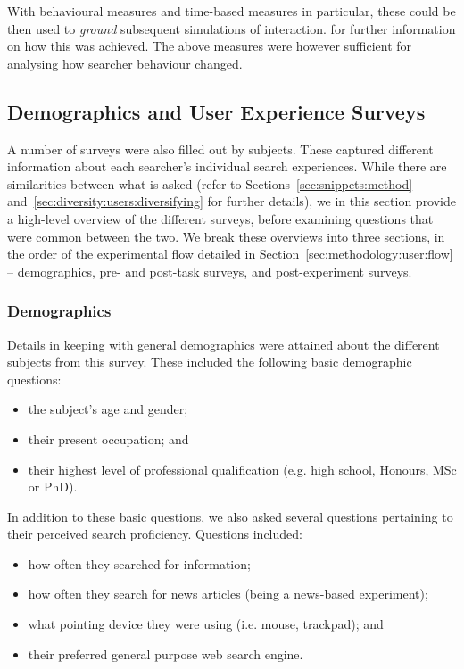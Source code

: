  With behavioural measures and time-based measures in particular, these could be then used to \emph{ground} subsequent simulations of interaction.  for further information on how this was achieved. The above measures were however sufficient for analysing how searcher behaviour changed.

\subsection{Demographics and User Experience Surveys}\label{sec:methodology:extracting:user}
A number of surveys were also filled out by subjects. These captured different information about each searcher's individual search experiences. While there are similarities between what is asked (refer to Sections~\ref{sec:snippets:method} and~\ref{sec:diversity:users:diversifying} for further details), we in this section provide a high-level overview of the different surveys, before examining questions that were common between the two. We break these overviews into three sections, in the order of the experimental flow detailed in Section~\ref{sec:methodology:user:flow} -- demographics, pre- and post-task surveys, and post-experiment surveys.

\subsubsection{Demographics}
Details in keeping with general demographics were attained about the different subjects from this survey. These included the following basic demographic questions:

\begin{itemize}
    \item{the subject's age and gender;}
    \item{their present occupation; and}
    \item{their highest level of professional qualification (e.g. high school, Honours, MSc or PhD).}
\end{itemize}

In addition to these basic questions, we also asked several questions pertaining to their perceived search proficiency. Questions included:

\begin{itemize}
    \item{how often they searched for information;}
    \item{how often they search for news articles (being a news-based experiment);}
    \item{what pointing device they were using (i.e. mouse, trackpad); and}
    \item{their preferred general purpose web search engine.}
\end{itemize}

